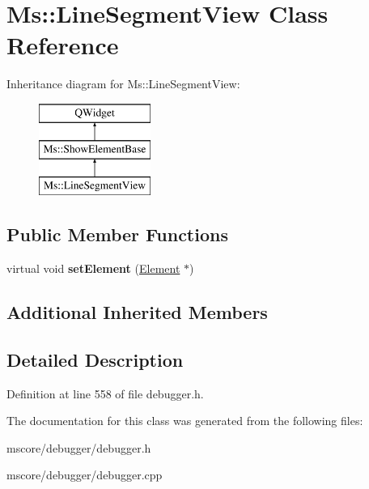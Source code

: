 \hypertarget{class_ms_1_1_line_segment_view}{}\section{Ms\+:\+:Line\+Segment\+View Class Reference}
\label{class_ms_1_1_line_segment_view}
Inheritance diagram for Ms\+:\+:Line\+Segment\+View\+:\begin{figure}[H]
\begin{center}
\leavevmode
\includegraphics[height=3.000000cm]{class_ms_1_1_line_segment_view}
\end{center}
\end{figure}
\subsection*{Public Member Functions}
\begin{DoxyCompactItemize}
\item 
\mbox{\label{class_ms_1_1_line_segment_view_a08d90707cae41c85781e0996da3fdf2c}} 
virtual void {\bfseries set\+Element} (\hyperlink{class_ms_1_1_element}{Element} $\ast$)
\end{DoxyCompactItemize}
\subsection*{Additional Inherited Members}


\subsection{Detailed Description}


Definition at line 558 of file debugger.\+h.



The documentation for this class was generated from the following files\+:\begin{DoxyCompactItemize}
\item 
mscore/debugger/debugger.\+h\item 
mscore/debugger/debugger.\+cpp\end{DoxyCompactItemize}
